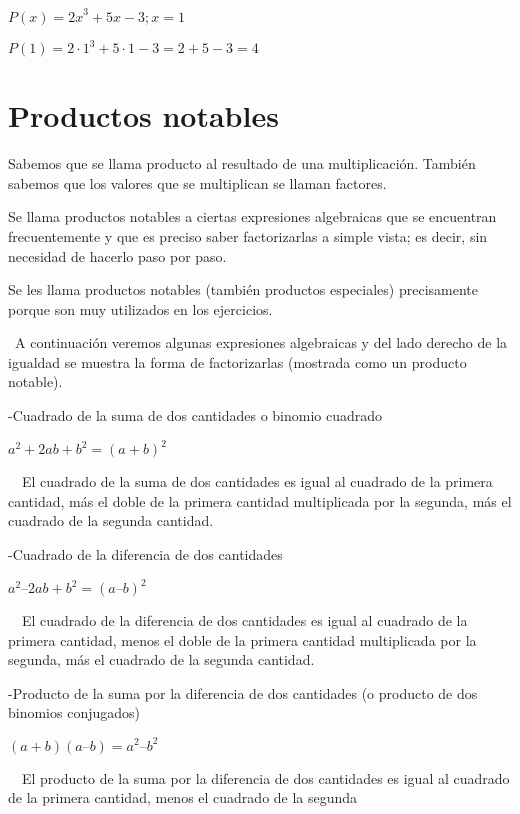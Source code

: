\documentclass{article}
\begin{document}
 $P(x)={2x}^{3}+5x-3;x=1$

 $P(1)=2\cdot 1^{3}+5\cdot 1-3=2+5-3=4$

\section[Productos notables]{Productos notables}
Sabemos que se llama producto al resultado de una multiplicaci\'on. Tambi\'en sabemos que los valores que se multiplican se llaman factores.

Se llama productos notables a ciertas expresiones algebraicas que se encuentran frecuentemente y que es preciso saber factorizarlas a simple vista; es decir, sin necesidad de hacerlo paso por paso.

Se les llama productos notables (tambi\'en productos especiales) precisamente porque son muy utilizados en los ejercicios.

\ A continuaci\'on veremos algunas expresiones algebraicas y del lado derecho de la igualdad se muestra la forma de factorizarlas (mostrada como un producto notable).


\bigskip

{}-Cuadrado de la suma de dos cantidades o binomio cuadrado

 $a^{2}+2ab+b^{2}={(a+b)}^{2}$

\ \ El cuadrado de la suma de dos cantidades es igual al cuadrado de la primera cantidad, m\'as el doble de la primera cantidad multiplicada por la segunda, m\'as el cuadrado de la segunda cantidad.


\bigskip


\bigskip

{}-Cuadrado de la diferencia de dos cantidades

 $a^{2}\text{--}2ab+b^{2}={(a\text{--}b)}^{2}$

\ \ El cuadrado de la diferencia de dos cantidades es igual al cuadrado de la primera cantidad, menos el doble de la primera cantidad multiplicada por la segunda, m\'as el cuadrado de la segunda cantidad.


\bigskip

{}-Producto de la suma por la diferencia de dos cantidades (o producto de dos binomios conjugados)

 $(a+b)(a\text{--}b)=a^{2}\text{--}b^{2}$

\ \ El producto de la suma por la diferencia de dos cantidades es igual al cuadrado de la primera cantidad, menos el cuadrado de la segunda \ 


\bigskip
\end{document}
